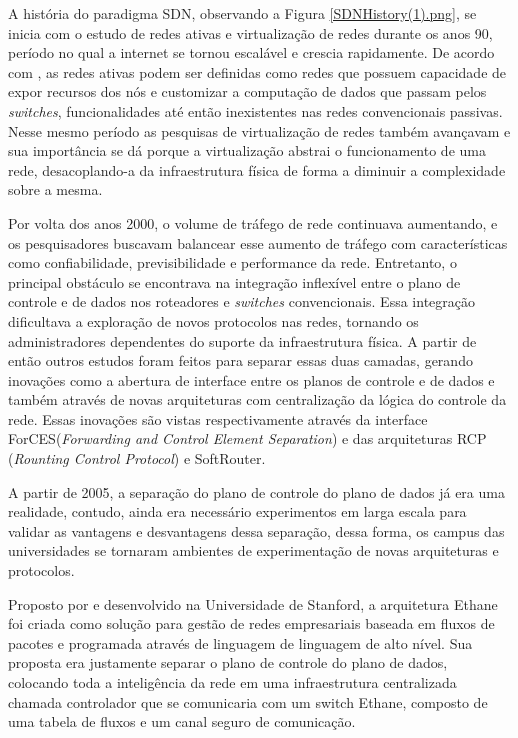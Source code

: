 \par A história do paradigma SDN, observando a Figura \ref{SDNHistory(1).png}, se inicia com o estudo de redes ativas e virtualização de redes durante os anos 90, período no qual a internet se tornou escalável e crescia rapidamente\cite{Feamster:2013:RS:2559899.2560327}.
De acordo com , as redes ativas podem ser definidas como redes que possuem capacidade de expor recursos dos nós e customizar a computação de dados que passam pelos \textit{switches}, funcionalidades até então inexistentes nas redes convencionais passivas. Nesse mesmo período as pesquisas de virtualização de redes também avançavam e sua importância se dá porque a virtualização abstrai o funcionamento de uma rede, desacoplando-a da infraestrutura física de forma a diminuir a complexidade sobre a mesma. 
\par Por volta dos anos 2000, o volume de tráfego de rede continuava aumentando, e os pesquisadores buscavam balancear esse aumento de tráfego com características como confiabilidade, previsibilidade e performance da rede. Entretanto, o principal obstáculo se encontrava na integração inflexível entre o plano de controle e de dados nos roteadores e \emph{switches} convencionais. Essa integração dificultava  a exploração de novos protocolos nas redes, tornando os administradores dependentes do suporte da infraestrutura física. A partir de então outros estudos foram feitos para separar essas duas camadas, gerando inovações como a abertura de interface entre os planos de controle e de dados e também através de novas arquiteturas com centralização da lógica do controle da rede. Essas inovações são vistas respectivamente através da interface ForCES(\textit{Forwarding and Control Element Separation}) e das arquiteturas RCP (\textit{Rounting Control Protocol}) e SoftRouter.
\cite{Nunes}
\par A partir de 2005, a separação do plano de controle do plano de dados já era uma realidade, contudo, ainda era necessário experimentos em larga escala para validar as vantagens e desvantagens dessa separação, dessa forma, os campus das universidades se tornaram ambientes de experimentação de novas arquiteturas e protocolos. 

Proposto por  e desenvolvido na Universidade de Stanford, a arquitetura Ethane foi criada como solução para gestão de redes empresariais baseada em fluxos de pacotes e programada através de linguagem de linguagem de alto nível. Sua proposta era justamente separar o plano de controle do plano de dados, colocando toda a inteligência da rede em uma infraestrutura centralizada chamada controlador que se comunicaria com um switch Ethane, composto de uma tabela de fluxos e um canal seguro de comunicação.

